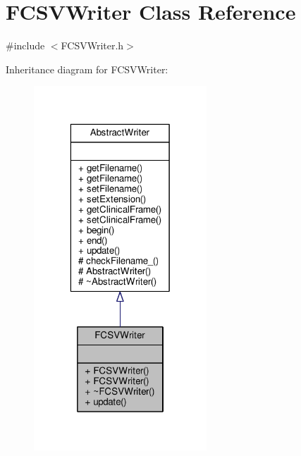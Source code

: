 \hypertarget{classFCSVWriter}{\section{F\-C\-S\-V\-Writer Class Reference}
\label{classFCSVWriter}
}


{\ttfamily \#include $<$F\-C\-S\-V\-Writer.\-h$>$}



Inheritance diagram for F\-C\-S\-V\-Writer\-:
\nopagebreak
\begin{figure}[H]
\begin{center}
\leavevmode
\includegraphics[width=184pt]{classFCSVWriter__inherit__graph}
\end{center}
\end{figure}


